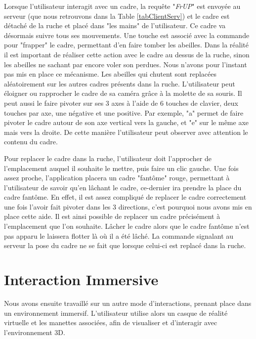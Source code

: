 		Lorsque l'utilisateur interagit avec un cadre, la requête "\textit{FrUP}" est envoyée au serveur (que nous retrouvons dans la Table \ref{tabClientServ}) et le cadre est détaché de la ruche et placé dans "les mains" de l'utilisateur. Ce cadre va désormais suivre tous ses mouvements. Une touche est associé avec la commande pour "frapper" le cadre, permettant d'en faire tomber les abeilles. Dans la réalité il est important de réaliser cette action avec le cadre au dessus de la ruche, sinon les abeilles ne sachant par encore voler son perdues. Nous n'avons pour l'instant pas mis en place ce mécanisme. Les abeilles qui chutent sont replacées aléatoirement sur les autres cadres présents dans la ruche.
		L'utilisateur peut éloigner ou rapprocher le cadre de sa caméra grâce à la molette de sa souris. Il peut aussi le faire pivoter sur ses 3 axes à l'aide de 6 touches de clavier, deux touches par axe, une négative et une positive. Par exemple, "a" permet de faire pivoter le cadre autour de son axe vertical vers la gauche, et "e" sur le même axe mais vers la droite. De cette manière l'utilisateur peut observer avec attention le contenu du cadre.
		
		Pour replacer le cadre dans la ruche, l'utilisateur doit l'approcher de l'emplacement auquel il souhaite le mettre, puis faire un clic gauche. Une fois assez proche, l'application placera un cadre "fantôme" rouge, permettant à l'utilisateur de savoir qu'en lâchant le cadre, ce-dernier ira prendre la place du cadre fantôme. En effet, il est assez compliqué de replacer le cadre correctement une fois l'avoir fait pivoter dans les 3 directions, c'est pourquoi nous avons mis en place cette aide. Il est ainsi possible de replacer un cadre précisément à l'emplacement que l'on souhaite. Lâcher le cadre alors que le cadre fantôme n'est pas apparu le laissera flotter là où il a été lâché. La commande signalant au serveur la pose du cadre ne se fait que lorsque celui-ci est replacé dans la ruche.
		
		
		
	\section{Interaction Immersive}
		Nous avons ensuite travaillé sur un autre mode d'interactions, prenant place dans un environnement immersif. L'utilisateur utilise alors un casque de réalité virtuelle et les manettes associées, afin de visualiser et d'interagir avec l'environnement 3D.
		
